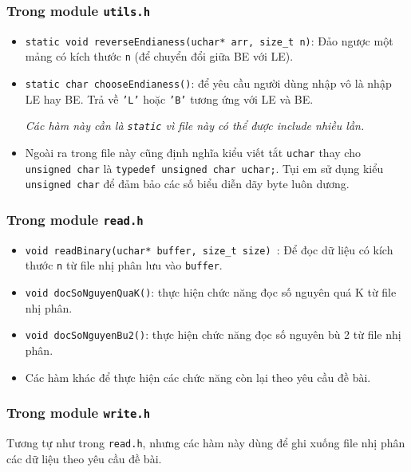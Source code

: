 \documentclass[12pt, final]{article}
\newcommand{\code}[1]{\texttt{#1}}
\begin{document}
\subsubsection{Trong module \code{utils.h}}
\begin{itemize}
    \item \code{static void reverseEndianess(uchar* arr, size\_t n)}: Đảo ngược một mảng có kích thước \code{n} (để chuyển đổi giữa BE với LE).
    \item \code{static char chooseEndianess()}: để yêu cầu người dùng nhập vô là nhập LE hay BE. Trả về \code{'L'} hoặc \code{'B'} tương ứng với LE và BE.\par 
    \textit{Các hàm này cần là \code{static} vì file này có thể được include nhiều lần.}
    \item Ngoài ra trong file này cũng định nghĩa kiểu viết tắt \code{uchar} thay cho \code{unsigned char} là \code{typedef unsigned char uchar;}. Tụi em sử dụng kiểu \code{unsigned char} để đảm bảo các số biểu diễn dãy byte luôn dương.
\end{itemize}


\subsubsection{Trong module \code{read.h}}
\begin{itemize}
    \item \code{void readBinary(uchar* buffer, size\_t size) }: Để đọc dữ liệu có kích thước \code{n} từ file nhị phân lưu vào \code{buffer}.
    \item \code{void docSoNguyenQuaK()}: thực hiện chức năng đọc số nguyên quá K từ file nhị phân.
    \item \code{void docSoNguyenBu2()}: thực hiện chức năng đọc số nguyên bù 2 từ file nhị phân.
    \item Các hàm khác để thực hiện các chức năng còn lại theo yêu cầu đề bài.
\end{itemize}

\subsubsection{Trong module \code{write.h}}
Tương tự như trong \code{read.h}, nhưng các hàm này dùng để ghi xuống file nhị phân các dữ liệu theo yêu cầu đề bài.
\end{document}
